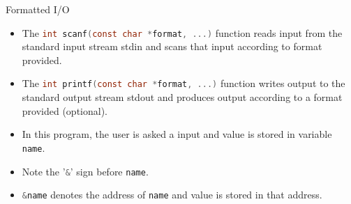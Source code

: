 \documentclass[10pt,t]{beamer}
\begin{document}
\begin{frame}[fragile]{Formatted I/O}
  \begin{itemize}
    \item The \lstinline[language=C,basicstyle=\scriptsize\ttfamily]|int scanf(const char *format, ...)| function reads input from the standard input stream stdin and scans that input according to format provided.
    \item The \lstinline[language=C,basicstyle=\scriptsize\ttfamily]|int printf(const char *format, ...)| function writes output to the standard output stream stdout and produces output according to a format provided (optional).
      
    \item In this program, the user is asked a input and value is stored in variable \lstinline|name|.
    \item Note the '\lstinline[language=C,basicstyle=\scriptsize\ttfamily]|&|' sign before \lstinline[language=C,basicstyle=\scriptsize\ttfamily]|name|.
    \item \lstinline[language=C,basicstyle=\scriptsize\ttfamily]|&name| denotes the address of \lstinline[language=C,basicstyle=\scriptsize\ttfamily]|name| and value is stored in that address.
  \end{itemize}
\end{frame}
\end{document}
